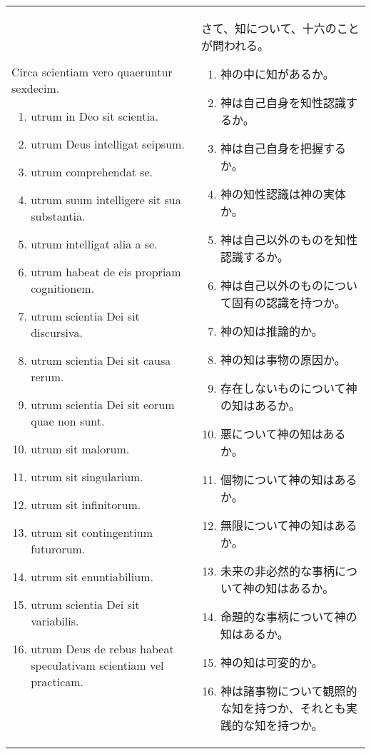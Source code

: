 \documentclass[10pt]{jsarticle} %
\begin{document}
\begin{longtable}{p{21em}p{21em}}
Circa scientiam vero quaeruntur sexdecim. 
\begin{enumerate}
 \item utrum in Deo sit scientia.
 \item utrum Deus intelligat seipsum.
 \item utrum comprehendat se.
 \item utrum suum intelligere sit sua substantia.
 \item utrum intelligat alia a se.
 \item utrum habeat de eis propriam cognitionem. 
 \item utrum scientia Dei sit discursiva.
 \item utrum scientia Dei sit causa rerum.
 \item utrum scientia Dei sit eorum quae non sunt.
 \item utrum sit malorum.
 \item utrum sit singularium.
 \item utrum sit infinitorum.
 \item utrum sit contingentium futurorum.
 \item utrum sit enuntiabilium.
 \item utrum scientia Dei sit variabilis.
 \item utrum Deus de rebus habeat speculativam scientiam vel practicam. 
\end{enumerate}
&
さて、知について、十六のことが問われる。
\begin{enumerate}
 \item 神の中に知があるか。
 \item 神は自己自身を知性認識するか。
 \item 神は自己自身を把握するか。
 \item 神の知性認識は神の実体か。
 \item 神は自己以外のものを知性認識するか。
 \item 神は自己以外のものについて固有の認識を持つか。
 \item 神の知は推論的か。
 \item 神の知は事物の原因か。
 \item 存在しないものについて神の知はあるか。
 \item 悪について神の知はあるか。
 \item 個物について神の知はあるか。
 \item 無限について神の知はあるか。
 \item 未来の非必然的な事柄について神の知はあるか。
 \item 命題的な事柄について神の知はあるか。
 \item 神の知は可変的か。
 \item 神は諸事物について観照的な知を持つか、それとも実践的な知を持つか。
\end{enumerate}

\\
\end{longtable}
\end{document}
